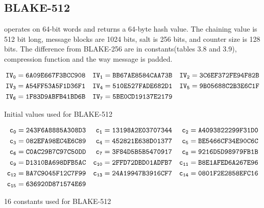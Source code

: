\subsection{BLAKE-512}

operates on 64-bit words and returns a 64-byte hash value. The chaining value is 512 bit long, message blocks are
1024 bits, salt is 256 bits, and counter size is 128 bits. The difference from BLAKE-256 are in constants(tables 3.8 
and 3.9), compression function and the way message is padded.

  \begin{table}
    \begin{align*}
      {\tt IV_{0}} &= {\tt 6A09E667F3BCC908} & {\tt IV_{1}} &= {\tt BB67AE8584CAA73B} & {\tt IV_{2}} &= {\tt 3C6EF372FE94F82B} \\
      {\tt IV_{3}} &= {\tt A54FF53A5F1D36F1} & {\tt IV_{4}} &= {\tt 510E527FADE682D1} & {\tt IV_{5}} &= {\tt 9B05688C2B3E6C1F} \\
      {\tt IV_{6}} &= {\tt 1F83D9ABFB41BD6B} & {\tt IV_{7}} &= {\tt 5BE0CD19137E2179} &                                        \\      
    \end{align*}
    \caption{Initial values used for BLAKE-512\cite{00002}}
  \end{table}
  
  \begin{table}
    \begin{align*}
         {\tt c_{0}}  &= {\tt 243F6A8885A308D3} & {\tt c_{1}}  &= {\tt 13198A2E03707344} & {\tt c_{2}}  &= {\tt A4093822299F31D0} 
      \\ {\tt c_{3}}  &= {\tt 082EFA98EC4E6C89} & {\tt c_{4}}  &= {\tt 452821E638D01377} & {\tt c_{5}}  &= {\tt BE5466CF34E90C6C} 
      \\ {\tt c_{6}}  &= {\tt C0AC29B7C97C50DD} & {\tt c_{7}}  &= {\tt 3F84D5B5B5470917} & {\tt c_{8}}  &= {\tt 9216D5D98979FB1B} 
      \\ {\tt c_{9}}  &= {\tt D1310BA698DFB5AC} & {\tt c_{10}} &= {\tt 2FFD72DBD01ADFB7} & {\tt c_{11}} &= {\tt B8E1AFED6A267E96} 
      \\ {\tt c_{12}} &= {\tt BA7C9045F12C7F99} & {\tt c_{13}} &= {\tt 24A19947B3916CF7} & {\tt c_{14}} &= {\tt 0801F2E2858EFC16} 
      \\ {\tt c_{15}} &= {\tt 636920D871574E69} &                                        &      
    \end{align*}
    \caption{16 constants used for BLAKE-512\cite{00002}}
  \end{table}
  
